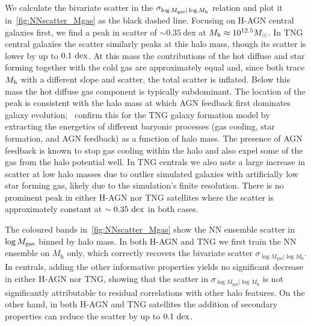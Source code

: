 \documentclass[useAMS,usenatbib]{mnras}
\begin{document}
We calculate the bivariate scatter in the $\sigma_{\log M_\mathrm{gas} | \log M_{\rm h}}$ relation and plot it in~\cref{fig:NNscatter_Mgas} as the black dashed line. Focusing on H-AGN central galaxies first, we find a peak in scatter of $\sim 0.35~\mathrm{dex}$ at $M_{\rm h}\approx 10^{12.5} M_\odot$. In TNG central galaxies the scatter similarly peaks at this halo mass, though its scatter is lower by up to $0.1~{\rm dex}$. At this mass the contributions of the hot diffuse and star forming together with the cold gas are approximately equal and, since both trace $M_{\rm h}$ with a different slope and scatter, the total scatter is inflated. Below this mass the hot diffuse gas component is typically subdominant. The location of the peak is consistent with the halo mass at which AGN feedback first dominates galaxy evolution;~\citet*[see Figure 7]{Anbajagane_2022} confirm this for the TNG galaxy formation model by extracting the energetics of different baryonic processes (gas cooling, star formation, and AGN feedback) as a function of halo mass. The presence of AGN feedback is known to stop gas cooling within the halo and also expel some of the gas from the halo potential well. In TNG centrals we also note a large increase in scatter at low halo masses due to outlier simulated galaxies with artificially low star forming gas, likely due to the simulation's finite resolution. There is no prominent peak in either H-AGN nor TNG satellites where the scatter is approximately constant at $\sim0.35~{\rm dex}$ in both cases.

The coloured bands in~\cref{fig:NNscatter_Mgas} show the NN ensemble scatter in $\log M_{\rm gas}$ binned by halo mass. In both H-AGN and TNG we first train the NN ensemble on $M_\mathrm{h}$ only, which correctly recovers the bivariate scatter $\sigma_{\log M_\mathrm{gas} | \log M_\mathrm{h}}$. In centrals, adding the other informative properties yields no significant decrease in either H-AGN nor TNG, showing that the scatter in $\sigma_{\log M_\mathrm{gas} | \log M_\mathrm{h}}$ is not significantly attributable to residual correlations with other halo features. On the other hand, in both H-AGN and TNG satellites the addition of secondary properties can reduce the scatter by up to $0.1~{\rm dex}$.
\end{document}
